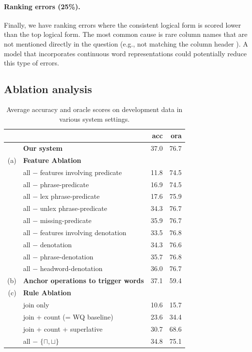 \paragraph{Ranking errors (25\%).}
Finally, we have ranking errors
where the consistent logical form is scored lower
than the top logical form.
The most common cause is rare column names
that are not mentioned directly in the question
(e.g.,  not matching the column header ).
A model that incorporates continuous word representations
could potentially reduce this type of errors.

\subsection{Ablation analysis}

\begin{table}[t]\centering
\begin{tabular}{r@{ }lrr} \toprule
&& \textbf{acc} & \textbf{ora} \\ \midrule
& \textbf{Our system} & 37.0 & 76.7 \\ 
(a) & \multicolumn{3}{l}{\textbf{Feature Ablation}} \\
& all $-$ features involving predicate & 11.8 & 74.5 \\
& \quad all $-$ phrase-predicate & 16.9 & 74.5 \\
& \qquad all $-$ lex phrase-predicate & 17.6 & 75.9 \\
& \qquad all $-$ unlex phrase-predicate & 34.3 & 76.7 \\
& \quad all $-$ missing-predicate & 35.9 & 76.7 \\
& all $-$ features involving denotation & 33.5 & 76.8 \\
& \quad all $-$ denotation & 34.3 & 76.6 \\
& \quad all $-$ phrase-denotation & 35.7 & 76.8 \\
& \quad all $-$ headword-denotation & 36.0 & 76.7 \\
(b) & \multicolumn{1}{l}{\textbf{Anchor operations to trigger words}} & 37.1 & 59.4 \\
(c) & \multicolumn{3}{l}{\textbf{Rule Ablation}} \\
& join only & 10.6 & 15.7 \\
& join + count (= WQ baseline) & 23.6 & 34.4 \\
& join + count + superlative & 30.7 & 68.6 \\
& all $-$ $\{\sqcap, \sqcup\}$ & 34.8 & 75.1 \\
\bottomrule
\end{tabular}
\caption{Average accuracy and oracle scores
on development data in various system settings.}\label{tab:sempre-ablation}
\end{table}

